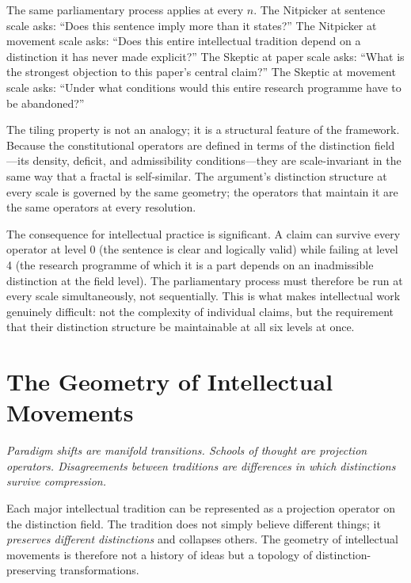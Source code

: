 \documentclass[12pt, letterpaper]{article}
\theoremstyle{remark}
\begin{document}
The same parliamentary process applies at every $n$.  The Nitpicker at
sentence scale asks: ``Does this sentence imply more than it states?''  The
Nitpicker at movement scale asks: ``Does this entire intellectual tradition
depend on a distinction it has never made explicit?''  The Skeptic at paper
scale asks: ``What is the strongest objection to this paper's central claim?''
The Skeptic at movement scale asks: ``Under what conditions would this entire
research programme have to be abandoned?''

The tiling property is not an analogy; it is a structural feature of the
framework.  Because the constitutional operators are defined in terms of the
distinction field---its density, deficit, and admissibility conditions---they
are scale-invariant in the same way that a fractal is self-similar.  The
argument's distinction structure at every scale is governed by the same
geometry; the operators that maintain it are the same operators at every
resolution.

The consequence for intellectual practice is significant.  A claim can survive
every operator at level 0 (the sentence is clear and logically valid) while
failing at level 4 (the research programme of which it is a part depends on
an inadmissible distinction at the field level).  The parliamentary process
must therefore be run at every scale simultaneously, not sequentially.  This
is what makes intellectual work genuinely difficult: not the complexity of
individual claims, but the requirement that their distinction structure be
maintainable at all six levels at once.

\section{The Geometry of Intellectual Movements}

\epigraph{\itshape Paradigm shifts are manifold transitions.  Schools of
thought are projection operators.  Disagreements between traditions are
differences in which distinctions survive compression.}{}

Each major intellectual tradition can be represented as a projection operator
on the distinction field.  The tradition does not simply believe different
things; it \emph{preserves different distinctions} and collapses others.  The
geometry of intellectual movements is therefore not a history of ideas but
a topology of distinction-preserving transformations.
\end{document}
